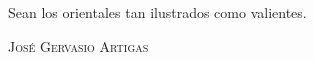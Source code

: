 \chapter*{}

\begin{flushright}
  \begin{minipage}[t]{0.6\textwidth} 
    Sean los orientales tan ilustrados como valientes.
    \begin{flushright} 
      \textsc{José Gervasio Artigas}
    \end{flushright}
  \end{minipage}
\end{flushright}
